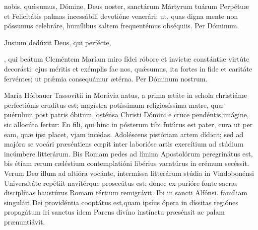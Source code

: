 \documentclass[fontsize=9pt,paper=A6,twoside,BCOR=1mm,DIV=22,headinclude]{scrarticle}
\begin{document}
\begin{multicols}{2}
 nobis, quǽsumus, Dómine, Deus noster, sanctárum Mártyrum tuárum Perpétuæ et Felicitátis palmas incessábili devotióne venerári: ut, quas digna mente non póssumus celebráre, humílibus saltem frequentémus obséquiis. \red{(}Per Dóminum.\red{)}



\AiiiC 

\V Justum dedúxit  Deus, qui perfécte, 






\VRCi 

\MiC 

, qui beátum Cleméntem Maríam miro fídei róbore et invíctæ constántiæ virtúte decorásti: ejus méritis et exémplis fac nos, qu\'æsumus, ita fortes in fide et caritáte fervéntes; ut pr\'æmia consequámur ætérna. Per Dóminum nostrum.



\columnbreak
{
 María Hófbauer Tassovítii in Morávia natus, a prima ætáte in schola christiánæ perfectiónis erudítus est; magístra potíssimum religiosíssima matre, quæ puérulum post patris óbitum, osténsa Christi Dómini e cruce pendéntis imágine, sic allocúta fertur: En fili, qui hinc in pósterum tibi futúrus est pater, cura ut per eam, quæ ipsi placet, vjam incédas. Adoléscens pistóriam artem dídicit; sed ad majóra se vocári præséntiens cœpit inter laborióse artis exercítium ad stúdium incúmbere litterárum. Bis Romam pedes ad límina Apostolórum peregrinátus est, bis étiam rerum cæléstium contemplatióni libérius vacatúrus in erémum secéssit. Verum Deo illum ad altióra vocánte, intermíssa litterárum stúdia in Vindobonénsi Universitáte repétiit navitérque prosecútus est; donec ex purióre fonte sacras disciplínas haustúrus Romam tértium remigrávit. Ibi in sancti Alfónsi. famíliam singulári Dei providéntia cooptátus est,quam ipsíus ópera in díssitas regiónes propagátum iri sanctus idem Parens divíno instínctu præsénsit ac palam prænuntiávit.

}
\end{multicols}
\end{document}
